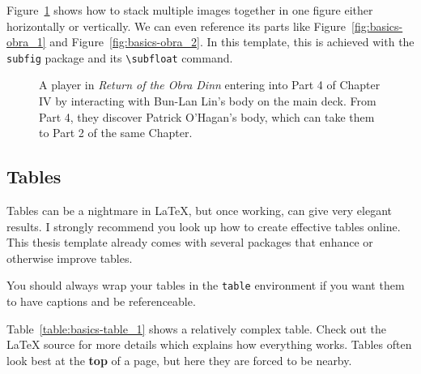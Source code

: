 Figure~\ref{fig:basics-obra} shows how to stack multiple images together in one figure either horizontally or vertically.
We can even reference its parts like Figure~\ref{fig:basics-obra_1} and Figure~\ref{fig:basics-obra_2}.
In this template, this is achieved with the \verb|subfig| package and its \verb|\subfloat| command.

\begin{figure}[!htbp]
  \centering
  
  \quad
  \caption{A player in \textit{Return of the Obra Dinn} entering into Part 4 of Chapter IV by interacting with Bun-Lan Lin's body on the main deck. From Part 4, they discover Patrick O'Hagan's body, which can take them to Part 2 of the same Chapter.}

  \label{fig:basics-obra}
\end{figure}

\subsection*{Tables}%
Tables can be a nightmare in \LaTeX{}, but once working, can give very elegant results.
I strongly recommend you look up how to create effective tables online.
This thesis template already comes with several packages that enhance or otherwise improve tables.

You should always wrap your tables in the \verb|table| environment if you want them to have captions and be referenceable.

Table~\ref{table:basics-table_1} shows a relatively complex table.
Check out the \LaTeX{} source for more details which explains how everything works.
Tables often look best at the \textbf{top} of a page, but here they are forced to be nearby.

